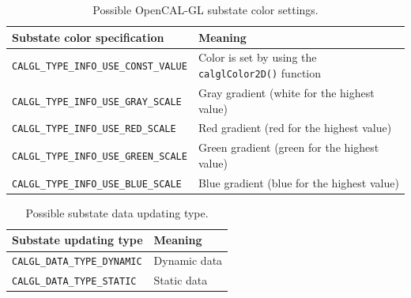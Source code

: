 \begin{table}
  \centering
  \footnotesize
  \begin{tabular}{l|l}
    \hline
    Substate color specification & Meaning \\
    \hline
    \verb'CALGL_TYPE_INFO_USE_CONST_VALUE' & Color is set by using the \verb'calglColor2D()' function\\
    \verb'CALGL_TYPE_INFO_USE_GRAY_SCALE'  & Gray gradient (white for the highest value)\\
    \verb'CALGL_TYPE_INFO_USE_RED_SCALE '  & Red gradient (red for the highest value)\\
    \verb'CALGL_TYPE_INFO_USE_GREEN_SCALE' & Green gradient (green for the highest value)\\
    \verb'CALGL_TYPE_INFO_USE_BLUE_SCALE'  & Blue gradient (blue for the highest value)\\
    \hline
  \end{tabular}
  \caption{Possible OpenCAL-GL substate color settings.}
  \label{tab:substate_color_info}
\end{table}

\begin{table}
  \centering
  \small
  \begin{tabular}{l|l}
    \hline
    Substate updating type & Meaning \\
    \hline
    \verb'CALGL_DATA_TYPE_DYNAMIC' & Dynamic data\\
    \verb'CALGL_DATA_TYPE_STATIC'  & Static data\\
    \hline
  \end{tabular}
  \caption{Possible substate data updating type.}
  \label{tab:substate_updating_type}
\end{table}


